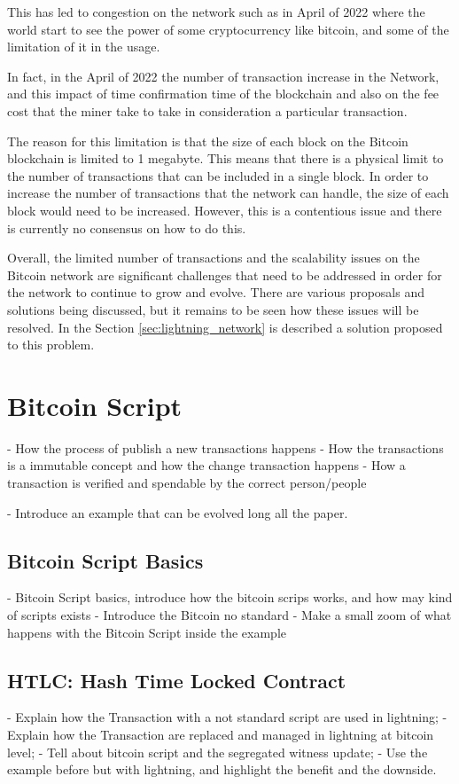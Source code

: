 This has led to congestion on the network such as in April of 2022 where the world start to
see the power of some cryptocurrency like bitcoin, and some of the limitation of it in the usage.

In fact, in the April of 2022 the number of transaction increase in the Network, and this
impact of time confirmation time of the blockchain and also on the fee cost that the miner
take to take in consideration a particular transaction.

The reason for this limitation is that the size of each block on the Bitcoin blockchain is
limited to 1 megabyte. This means that there is a physical limit to the number of transactions
that can be included in a single block. In order to increase the number of transactions
that the network can handle, the size of each block would need to be increased. However,
this is a contentious issue and there is currently no consensus on how to do this.

Overall, the limited number of transactions and the scalability issues on the Bitcoin network
are significant challenges that need to be addressed in order for the network to continue
to grow and evolve. There are various proposals and solutions being discussed,
but it remains to be seen how these issues will be resolved. In the Section \ref{sec:lightning_network}
is described a solution proposed to this problem.


\section{Bitcoin Script}

- How the process of publish a new transactions happens
- How the transactions is a immutable concept and how the change transaction happens
- How a transaction is verified and spendable by the correct person/people

- Introduce an example that can be evolved long all the paper.

\subsection{Bitcoin Script Basics}

- Bitcoin Script basics, introduce how the bitcoin scrips works, and how may
kind of scripts exists
- Introduce the Bitcoin no standard
- Make a small zoom of what happens with the Bitcoin Script inside the example

\subsection{HTLC: Hash Time Locked Contract}
\label{sec:htlc_intro}

- Explain how the Transaction with a not standard script are used in lightning;
- Explain how the Transaction are replaced and managed in lightning at bitcoin level;
- Tell about bitcoin script and the segregated witness update;
- Use the example before but with lightning, and highlight the benefit and the downside.
